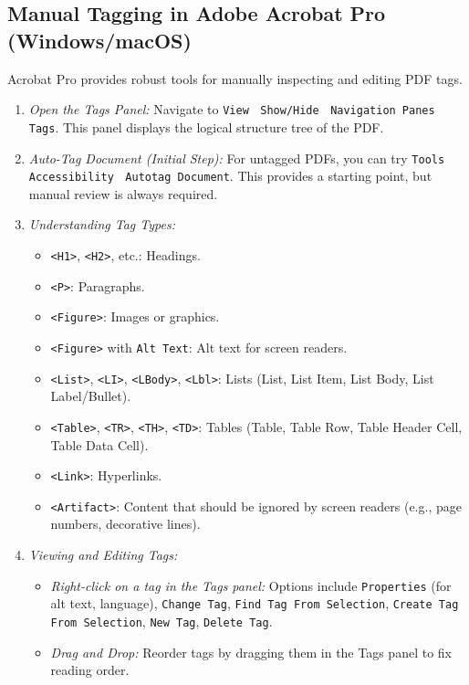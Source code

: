 \subsection{Manual Tagging in Adobe Acrobat Pro (Windows/macOS)}
\label{subsec:manual-tagging-acrobat}
Acrobat Pro provides robust tools for manually inspecting and editing PDF tags.

\begin{enumerate}
\item \emph{Open the Tags Panel:} Navigate to \texttt{View} $\>$ \texttt{Show/Hide} $\>$ \texttt{Navigation Panes} $\>$ \texttt{Tags}. This panel displays the logical structure tree of the PDF.
\item \emph{Auto-Tag Document (Initial Step):} For untagged PDFs, you can try \texttt{Tools} $\>$ \texttt{Accessibility} $\>$ \texttt{Autotag Document}. This provides a starting point, but manual review is always required.
\item \emph{Understanding Tag Types:}
    \begin{itemize}
    \item \texttt{<H1>}, \texttt{<H2>}, etc.: Headings.
    \item \texttt{<P>}: Paragraphs.
    \item \texttt{<Figure>}: Images or graphics.
    \item \texttt{<Figure>} with \texttt{Alt Text}: Alt text for screen readers.
    \item \texttt{<List>}, \texttt{<LI>}, \texttt{<LBody>}, \texttt{<Lbl>}: Lists (List, List Item, List Body, List Label/Bullet).
    \item \texttt{<Table>}, \texttt{<TR>}, \texttt{<TH>}, \texttt{<TD>}: Tables (Table, Table Row, Table Header Cell, Table Data Cell).
    \item \texttt{<Link>}: Hyperlinks.
    \item \texttt{<Artifact>}: Content that should be ignored by screen readers (e.g., page numbers, decorative lines).
    \end{itemize}
\item \emph{Viewing and Editing Tags:}
    \begin{itemize}
    \item \emph{Right-click on a tag in the Tags panel:} Options include \texttt{Properties} (for alt text, language), \texttt{Change Tag}, \texttt{Find Tag From Selection}, \texttt{Create Tag From Selection}, \texttt{New Tag}, \texttt{Delete Tag}.
    \item \emph{Drag and Drop:} Reorder tags by dragging them in the Tags panel to fix reading order.

\end{itemize}
\end{enumerate}
